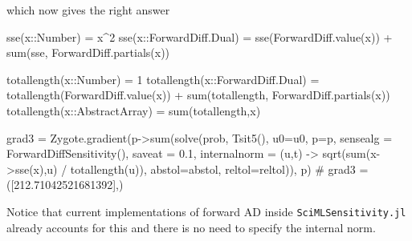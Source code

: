 which now gives the right answer
\begin{jllisting}
sse(x::Number) = x^2
sse(x::ForwardDiff.Dual) = sse(ForwardDiff.value(x)) + sum(sse, ForwardDiff.partials(x))

totallength(x::Number) = 1
totallength(x::ForwardDiff.Dual) = totallength(ForwardDiff.value(x)) + sum(totallength, ForwardDiff.partials(x))
totallength(x::AbstractArray) = sum(totallength,x)

grad3 = Zygote.gradient(p->sum(solve(prob, Tsit5(), u0=u0, p=p, sensealg = ForwardDiffSensitivity(), saveat = 0.1, internalnorm = (u,t) -> sqrt(sum(x->sse(x),u) / totallength(u)), abstol=abstol, reltol=reltol)), p)
# grad3 = ([212.71042521681392],)
\end{jllisting}
Notice that current implementations of forward AD inside \texttt{SciMLSensitivity.jl} already accounts for this and there is no need to specify the internal norm. 